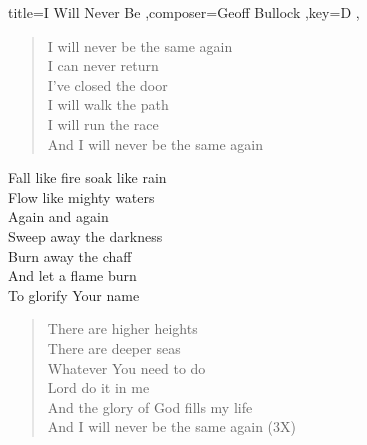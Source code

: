 \documentclass[]{leadsheet}
\begin{document}
\begin{song}{title={I Will Never Be
},composer={Geoff Bullock
},key={D
},}
\begin{verse}
I will never be the same again \\
I can never return \\
I've closed the door \\
I will walk the path \\
I will run the race \\
And I will never be the same again \\
\end{verse}

\begin{chorus}
Fall like fire soak like rain \\
Flow like mighty waters \\
Again and again \\
Sweep away the darkness \\
Burn away the chaff \\
And let a flame burn \\
To glorify Your name \\
\end{chorus}

\begin{verse}
There are higher heights \\
There are deeper seas \\
Whatever You need to do \\
Lord do it in me \\
And the glory of God fills my life \\
And I will never be the same again (3X) \\
\end{verse}

\end{song}
\end{document}
